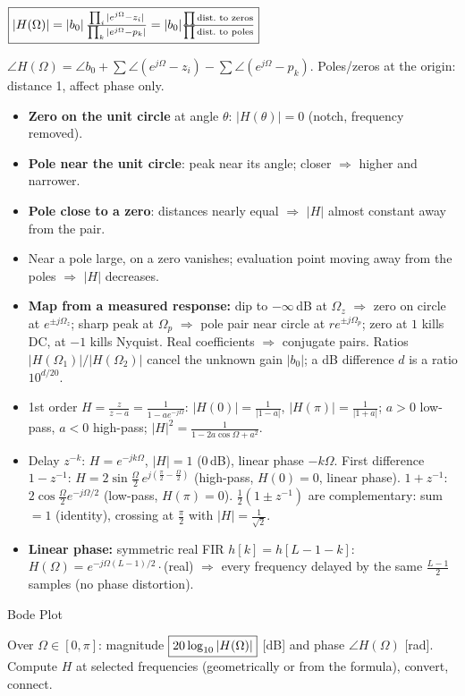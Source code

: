\documentclass[a4paper,landscape]{article}
\newcommand{\sub}[1]{\par\vspace{0.6pt}\noindent\colorbox{subblue}{\parbox{\dimexpr\linewidth-2\fboxsep}{\bfseries\strut #1}}\par\vspace{0.2pt}}
\newcommand{\bx}[1]{\fbox{$\textstyle #1$}}
\newcommand{\eqc}[1]{\par\vspace{0.2pt}\centerline{$#1$}\par\vspace{0.2pt}}
\begin{document}
\begin{multicols*}{4}
\eqc{\bx{|H(\Omega)|=|b_0|\,\frac{\prod_i|e^{j\Omega}-z_i|}{\prod_k|e^{j\Omega}-p_k|}=|b_0|\frac{\prod\text{dist.\ to zeros}}{\prod\text{dist.\ to poles}}}}
$\angle H(\Omega)=\angle b_0+\sum\angle(e^{j\Omega}{-}z_i)-\sum\angle(e^{j\Omega}{-}p_k)$. Poles/zeros at the origin: distance 1, affect phase only.
\begin{itemize}
\item \textbf{Zero on the unit circle} at angle $\theta$: $|H(\theta)|=0$ (notch, frequency removed).
\item \textbf{Pole near the unit circle}: peak near its angle; closer $\Rightarrow$ higher and narrower.
\item \textbf{Pole close to a zero}: distances nearly equal $\Rightarrow$ $|H|$ almost constant away from the pair.
\item Near a pole large, on a zero vanishes; evaluation point moving away from the poles $\Rightarrow$ $|H|$ decreases.
\item \textbf{Map from a measured response:} dip to $-\infty$\,dB at $\Omega_z$ $\Rightarrow$ zero on circle at $e^{\pm j\Omega_z}$; sharp peak at $\Omega_p$ $\Rightarrow$ pole pair near circle at $re^{\pm j\Omega_p}$; zero at $1$ kills DC, at $-1$ kills Nyquist. Real coefficients $\Rightarrow$ conjugate pairs. Ratios $|H(\Omega_1)|/|H(\Omega_2)|$ cancel the unknown gain $|b_0|$; a dB difference $d$ is a ratio $10^{d/20}$.
\item 1st order $H=\frac{z}{z-a}=\frac1{1-ae^{-j\Omega}}$: $|H(0)|=\frac1{|1-a|}$, $|H(\pi)|=\frac1{|1+a|}$; $a{>}0$ low-pass, $a{<}0$ high-pass; $|H|^2=\frac1{1-2a\cos\Omega+a^2}$.
\item Delay $z^{-k}$: $H=e^{-jk\Omega}$, $|H|=1$ (0\,dB), linear phase $-k\Omega$. First difference $1{-}z^{-1}$: $H=2\sin\frac\Omega2\,e^{j(\frac\pi2-\frac\Omega2)}$ (high-pass, $H(0){=}0$, linear phase). $1{+}z^{-1}$: $2\cos\frac\Omega2e^{-j\Omega/2}$ (low-pass, $H(\pi){=}0$). $\frac12(1{\pm}z^{-1})$ are complementary: sum $=1$ (identity), crossing at $\frac\pi2$ with $|H|=\frac1{\sqrt2}$.
\item \textbf{Linear phase:} symmetric real FIR $h[k]=h[L{-}1{-}k]$: $H(\Omega)=e^{-j\Omega(L-1)/2}\cdot$(real) $\Rightarrow$ every frequency delayed by the same $\frac{L-1}2$ samples (no phase distortion).
\end{itemize}
\sub{Bode Plot}
Over $\Omega\in[0,\pi]$: magnitude $\bx{20\log_{10}|H(\Omega)|}$ [dB] and phase $\angle H(\Omega)$ [rad]. Compute $H$ at selected frequencies (geometrically or from the formula), convert, connect.

\end{multicols*}
\end{document}
